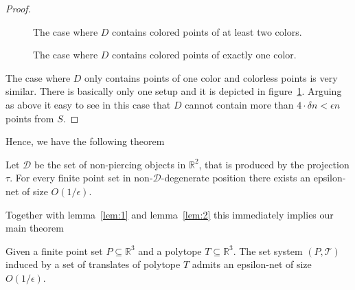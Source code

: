 \documentclass{stacs_proc}
\newcommand{\bigO}{O}
\newcommand{\setR}{\mathbb{R}}
\newcommand{\D}{\mathcal{D}}
\newcommand{\T}{\mathcal{T}}
\begin{document}
\begin{proof}
\begin{figure}
\begin{minipage}{0.45\textwidth}
\begin{center}
    \vspace{-1ex}
    \caption{The case where $D$ contains colored points of at least
      two colors.} 
    \label{fig:delauny3}
  \end{center}
\end{minipage}\hfill
\begin{minipage}{0.45\textwidth}
  \begin{center}
     \vspace{-1ex}
    \caption{The case where $D$ contains colored points of exactly one
      color.} 
    \label{fig:delauny4}
  \end{center}
\end{minipage}
\end{figure}

The case where $D$ only contains points of one color and colorless
points is very similar. There is basically only one setup and it is
depicted in figure~\ref{fig:delauny4}. Arguing as above it easy to see
in this case that $D$ cannot contain more than $4\cdot \delta n < \epsilon n$ points
from $S$.  
\end{proof}
Hence, we have the following theorem
\begin{theorem}
  Let $\D$ be the set of non-piercing objects in $\setR^2$,
  that is produced by the projection $\tau$. For every finite point set
  in non-$\D$-degenerate position there exists an epsilon-net of size 
  $\bigO(1/ \epsilon)$. 
\end{theorem}
Together with lemma~\ref{lem:1} and lemma~\ref{lem:2} this
immediately implies our main theorem  
\begin{theorem}
  Given a finite point set $P\subseteq \setR^3$ and a polytope $T\subseteq \setR^3$. The set
  system $(P, \T)$ induced by a set of translates of polytope $T$ 
  admits an epsilon-net of size $\bigO(1/ \epsilon)$. 
\end{theorem}







\vskip-0.3cm
\end{document}
